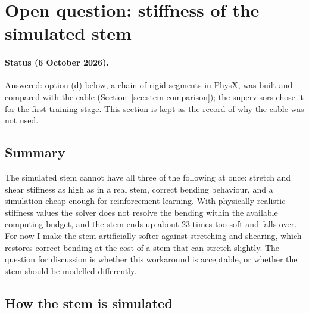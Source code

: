 %


\section{Open question: stiffness of the simulated stem}
\label{sec:stem-tradeoff}

\paragraph{Status (6 October 2026).} Answered: option (d) below, a chain of rigid segments in PhysX, was
built and compared with the cable (Section~\ref{sec:stem-comparison}); the supervisors chose it for the first
training stage. This section is kept as the record of why the cable was not used.

\subsection{Summary}

The simulated stem cannot have all three of the following at once: stretch and shear stiffness as high as
in a real stem, correct bending behaviour, and a simulation cheap enough for reinforcement learning. With
physically realistic stiffness values the solver does not resolve the bending within the available
computing budget, and the stem ends up about 23 times too soft and falls over. For now I make the stem
artificially softer against stretching and shearing, which restores correct bending at the cost of a stem
that can stretch slightly. The question for discussion is whether this workaround is acceptable, or whether
the stem should be modelled differently.

\subsection{How the stem is simulated}

